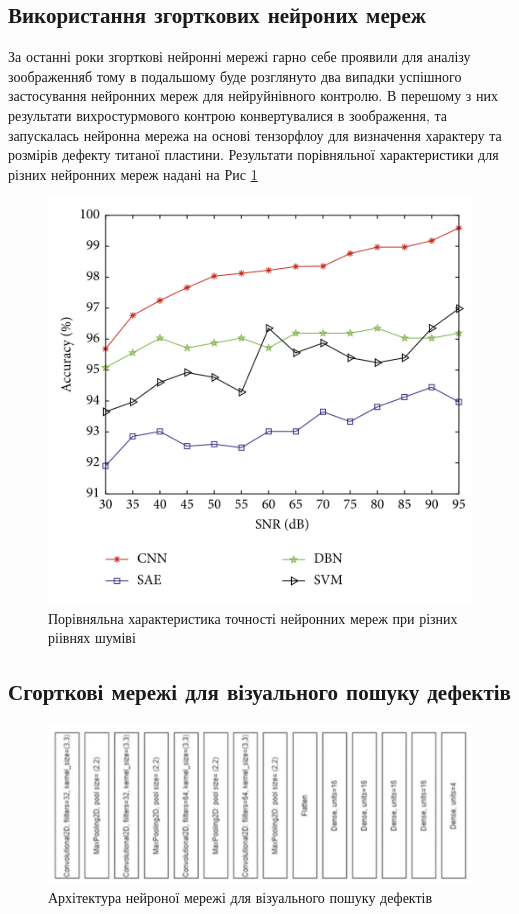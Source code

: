 \documentclass[a4paper, 14pt]{article}
\numberwithin{equation}{section}
\numberwithin{table}{section}
\begin{document}
\subsection{Використання згорткових нейроних мереж}
За останні роки згорткові нейронні мережі гарно себе проявили для аналізу зоображенняб тому в подальшому буде розглянуто два випадки успішного застосування нейронних мереж для нейруйнівного контролю. 
В перешому з них результати вихростурмового контрою конвертувалися в зоображення, та запускалась нейронна мережа на основі тензорфлоу для визначення характеру та розмірів дефекту титаної пластини.
Результати порівняльної характеристики для різних нейронних мереж надані на Рис \ref{fig1}
\begin{figure}[htbp]
	\centerline{\includegraphics[scale=1]{res/image1.png}}
	\caption{Порівняльна характеристика точності нейронних мереж при різних ріівнях шуміві}
	\label{fig1}
\end{figure}
%
\newpage

\subsection{Сгорткові мережі для візуального пошуку дефектів}
\begin{figure}[htbp]
	\centerline{\includegraphics[scale=.7]{res/image4.png}}
	\caption{Архітектура нейроної мережі для візуального пошуку дефектів}
	\label{fig4}
\end{figure}
\end{document}
